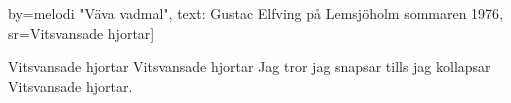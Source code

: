	by={melodi "Väva vadmal", text: Gustac Elfving på Lemsjöholm sommaren 1976},					
	sr={Vitsvansade hjortar}]					
	
\beginverse*
Vitsvansade hjortar
Vitsvansade hjortar
Jag tror jag snapsar 
tills jag kollapsar
Vitsvansade hjortar.
\endverse									
\endsong							
